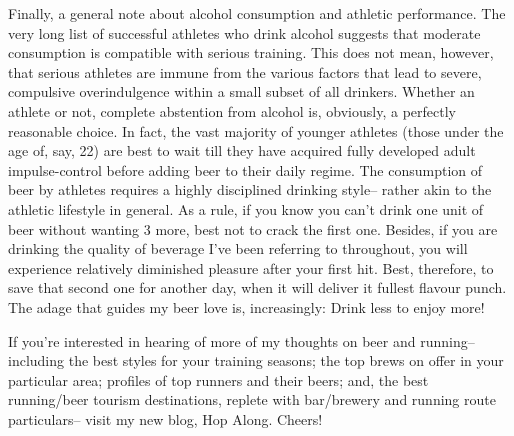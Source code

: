 Finally, a general note about alcohol consumption and athletic performance. The very long list of successful athletes who drink alcohol suggests that moderate consumption is compatible with serious training. This does not mean, however, that serious athletes are immune from the various factors that lead to severe, compulsive overindulgence within a small subset of all drinkers. Whether an athlete or not, complete abstention from alcohol is, obviously, a perfectly reasonable choice. In fact, the vast majority of younger athletes (those under the age of, say, 22) are best to wait till they have acquired fully developed adult impulse-control before adding beer to their daily regime. The consumption of beer by athletes requires a highly disciplined drinking style-- rather akin to the athletic lifestyle in general. As a rule, if you know you can't drink one unit of beer without wanting 3 more, best not to crack the first one. Besides, if you are drinking the quality of beverage I've been referring to throughout, you will experience relatively diminished pleasure after your first hit. Best, therefore, to save that second one for another day, when it will deliver it fullest flavour punch. The adage that guides my beer love is, increasingly: Drink less to enjoy more!

If you're interested in hearing of more of my thoughts on beer and running-- including the best styles for your training seasons; the top brews on offer in your particular area; profiles of top runners and their beers; and, the best running/beer tourism destinations, replete with bar/brewery and running route particulars-- visit my new blog, Hop Along. Cheers!




